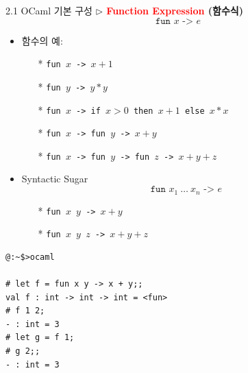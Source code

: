 \documentclass[10pt]{beamer}
\begin{document}
	\begin{frame}{2.1 OCaml 기본 구성}
		\textbf{$\triangleright$ \textcolor{red}{Function Expression} (함수식)}
		\[
		\texttt{fun $x$ -> $e$}
		\] 
		\begin{itemize}
			\item 함수의 예:
			\begin{itemize}
				\item[*] \texttt{fun $x$ -> $x+1$}
				\item[*] \texttt{fun $y$ -> $y*y$}
				\item[*] \texttt{fun $x$ -> if $x>0$ then $x+1$ else $x*x$}
				\item[*] \texttt{fun $x$ -> fun $y$ -> $x+y$}
				\item[*] \texttt{fun $x$ -> fun $y$ -> fun $z$ -> $x+y+z$}
			\end{itemize}
			\item[]
			\item Syntactic Sugar \[
			\texttt{fun $x_1\ \dots\ x_n$\ ->\ $e$}
			\]
			\begin{itemize}
				\item[*] \texttt{fun $x$ $y$ -> $x+y$}
				\item[*] \texttt{fun $x$ $y$ $z$ -> $x+y+z$}
			\end{itemize}
		\end{itemize}
	\end{frame}
\begin{itemize}
	\item[]
	\item[]
	\item[]
\end{itemize}
\begin{lstlisting}[style=zsh]
@:~$>ocaml

# let f = fun x y -> x + y;;
val f : int -> int -> int = <fun>
# f 1 2;
- : int = 3
# let g = f 1;
# g 2;;
- : int = 3
\end{lstlisting}
\end{document}
